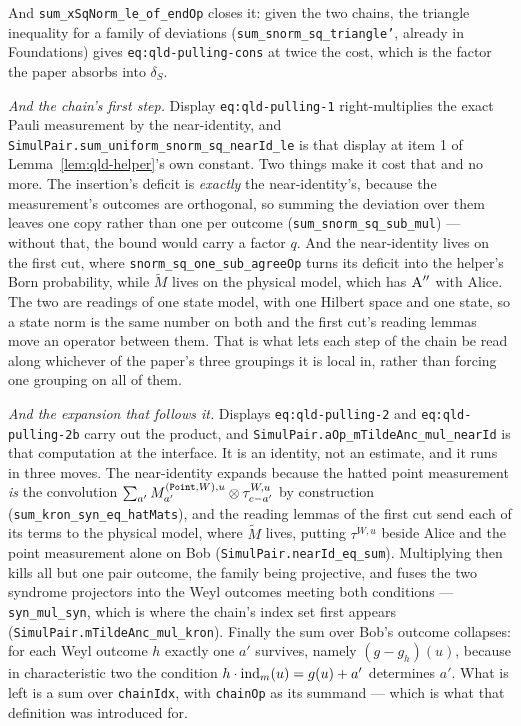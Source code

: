 And \texttt{sum\_xSqNorm\_le\_of\_endOp} closes it: given the two chains, the triangle inequality
for a family of deviations (\texttt{sum\_snorm\_sq\_triangle'}, already in Foundations) gives
\texttt{eq:qld-pulling-cons} at twice the cost, which is the factor the paper absorbs into
$\delta_S$.

\emph{And the chain's first step.} Display \texttt{eq:qld-pulling-1} right-multiplies the exact
Pauli measurement by the near-identity, and \texttt{SimulPair.sum\_uniform\_snorm\_sq\_nearId\_le}
is that display at item 1 of Lemma~\ref{lem:qld-helper}'s own constant. Two things make it cost
that and no more. The insertion's deficit is \emph{exactly} the near-identity's, because the
measurement's outcomes are orthogonal, so summing the deviation over them leaves one copy rather
than one per outcome (\texttt{sum\_snorm\_sq\_sub\_mul}) --- without that, the bound would carry a
factor $q$. And the near-identity lives on the first cut, where
\texttt{snorm\_sq\_one\_sub\_agreeOp} turns its deficit into the helper's Born probability, while
$\tilde{M}$ lives on the physical model, which has $\textsc{A}''$ with Alice. The two are readings of
one state model, with one Hilbert space and one state, so a state norm is the same number on both
and the first cut's reading lemmas move an operator between them. That is what lets each step of
the chain be read along whichever of the paper's three groupings it is local in, rather than
forcing one grouping on all of them.

\emph{And the expansion that follows it.} Displays \texttt{eq:qld-pulling-2} and
\texttt{eq:qld-pulling-2b} carry out the product, and \texttt{SimulPair.aOp\_mTildeAnc\_mul\_nearId}
is that computation at the interface. It is an identity, not an estimate, and it runs in three
moves. The near-identity expands because the hatted point measurement \emph{is} the convolution
$\sum_{a'} M^{(\mathtt{Point},W),u}_{a'} \otimes \tau^{W,u}_{c-a'}$ by construction
(\texttt{sum\_kron\_syn\_eq\_hatMats}), and the reading lemmas of the first cut send each of its
terms to the physical model, where $\tilde{M}$ lives, putting $\tau^{W,u}$ beside Alice and the
point measurement alone on Bob (\texttt{SimulPair.nearId\_eq\_sum}). Multiplying then kills all but
one pair outcome, the family being projective, and fuses the two syndrome projectors into the Weyl
outcomes meeting both conditions --- \texttt{syn\_mul\_syn}, which is where the chain's index set
first appears (\texttt{SimulPair.mTildeAnc\_mul\_kron}). Finally the sum over Bob's outcome
collapses: for each Weyl outcome $h$ exactly one $a'$ survives, namely $(g - g_h)(u)$, because in
characteristic two the condition $h \cdot \mathrm{ind}_m(u) = g(u) + a'$ determines $a'$. What is left is a
sum over \texttt{chainIdx}, with \texttt{chainOp} as its summand --- which is what that definition
was introduced for.

